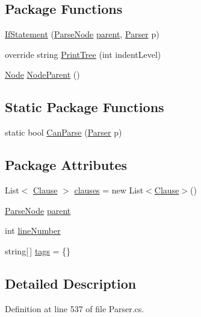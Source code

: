 \subsection*{Package Functions}
\begin{DoxyCompactItemize}
\item 
\hyperlink{a00120_ae534078389e8663edf7660403acf3cbc}{If\-Statement} (\hyperlink{a00150}{Parse\-Node} \hyperlink{a00150_af313a82103fcc2ff5a177dbb06b92f7b}{parent}, \hyperlink{a00151}{Parser} p)
\item 
override string \hyperlink{a00120_a5494c1daef8e0f3ac3ab68f91db4f332}{Print\-Tree} (int indent\-Level)
\item 
\hyperlink{a00140}{Node} \hyperlink{a00150_a580e520a29444fc23ac3660cbe514a09}{Node\-Parent} ()
\end{DoxyCompactItemize}
\subsection*{Static Package Functions}
\begin{DoxyCompactItemize}
\item 
static bool \hyperlink{a00120_afd6b96e1a27872701c4e6832f17fc3ce}{Can\-Parse} (\hyperlink{a00151}{Parser} p)
\end{DoxyCompactItemize}
\subsection*{Package Attributes}
\begin{DoxyCompactItemize}
\item 
List$<$ \hyperlink{a00052}{Clause} $>$ \hyperlink{a00120_a679b1a21582c78ed06df36bccc9c3cbc}{clauses} = new List$<$\hyperlink{a00052}{Clause}$>$()
\item 
\hyperlink{a00150}{Parse\-Node} \hyperlink{a00150_af313a82103fcc2ff5a177dbb06b92f7b}{parent}
\item 
int \hyperlink{a00150_a18b493382de0fde5b4299c1bd2250075}{line\-Number}
\item 
string\mbox{[}$\,$\mbox{]} \hyperlink{a00150_a58b3a15788fd2d4127d73619dc6d04ae}{tags} = \{\}
\end{DoxyCompactItemize}


\subsection{Detailed Description}


Definition at line 537 of file Parser.\-cs.



